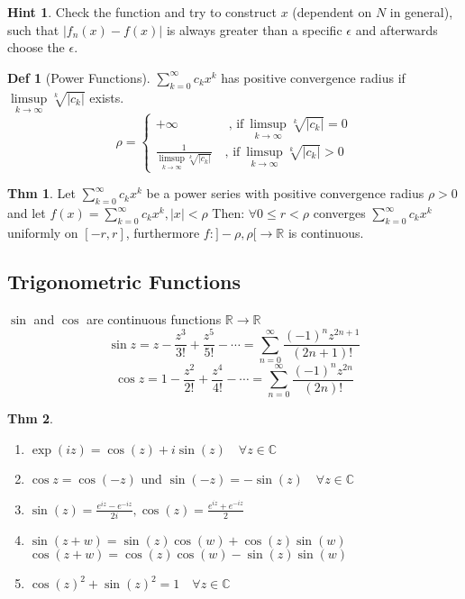 \documentclass[a4paper, 10pt]{article}
\theoremstyle{definition}
\newtheorem*{theorem}{Thm}
\newtheorem*{definition}{Def}
\newtheorem*{note_wrapper}{Hint}
\theoremstyle{named}
\newenvironment{note}%
    {\begin{mdframed}[style=trick]\begin{note_wrapper}}%
    {\end{note_wrapper}\end{mdframed}}
\newcommand{\R}{\mathbb{R}}
\newcommand{\C}{\mathbb{C}}
\begin{document}
\begin{note}
    Check the function and try to construct $x$ (dependent on $N$ in general), such that $|f_n(x) - f(x)|$ is always greater than a specific $\epsilon$ and afterwards choose the $\epsilon$.
\end{note}

\begin{definition}[Power Functions]
    $\sum_{k = 0}^\infty c_k x^k$ has positive convergence radius if $\underset{k \to \infty}{\limsup} \sqrt[k]{|c_k|}$ exists.
    $$\rho = \begin{cases}
        + \infty \quad \quad \quad \quad \text{, if} \ \underset{k \to \infty}{\limsup} \sqrt[k]{|c_k|} = 0 \\
        \frac{1}{\underset{k \to \infty}{\limsup} \sqrt[k]{|c_k|}} \quad \text{, if} \ \underset{k \to \infty}{\limsup} \sqrt[k]{|c_k|} > 0
    \end{cases}$$
\end{definition}

\begin{theorem}
    Let $\sum_{k=0}^\infty c_kx^k$ be a power series with positive convergence radius $\rho > 0$ and let $f(x) = \sum_{k=0}^\infty c_kx^k, |x| < \rho$ Then: $\forall 0 \leq r < \rho$ converges $\sum_{k=0}^\infty c_kx^k$ uniformly on $[-r,r]$, furthermore  $f: ]-\rho, \rho[ \to \mathbb{R}$ is continuous.
\end{theorem}

\subsection{Trigonometric Functions}
$\sin$ and $\cos$ are continuous functions $\R \to \R$
$$\sin z = z - \frac{z^3}{3!} + \frac{z^5}{5!} - \cdots = \sum_{n = 0}^\infty \frac{(-1)^n z^{2n + 1}}{(2n + 1)!}$$
$$\cos z = 1 - \frac{z^2}{2!} + \frac{z^4}{4!} - \cdots = \sum_{n = 0}^\infty \frac{(-1)^n z^{2n}}{(2n)!}$$

\begin{theorem}
    \begin{enumerate}
        \item $\exp(iz) = \cos(z) +i\sin(z) \quad \forall z \in \C$
        \item $\cos z = \cos(-z) \text{ und } \sin(-z) = - \sin(z) \quad \forall z \in \C$
        \item $\sin(z) = \frac{e^{iz}-e^{-iz}}{2i}, \cos(z) = \frac{e^{iz}+e^{-iz}}{2}$
        \item $\sin(z+w) = \sin(z)\cos(w) + \cos(z)\sin(w)$ \\
            $\cos(z+w) = \cos(z)\cos(w) - \sin(z)\sin(w)$
        \item $\cos(z)^2+\sin(z)^2 = 1 \quad \forall z \in \mathbb{C}$
    \end{enumerate}
\end{theorem}
\end{document}
